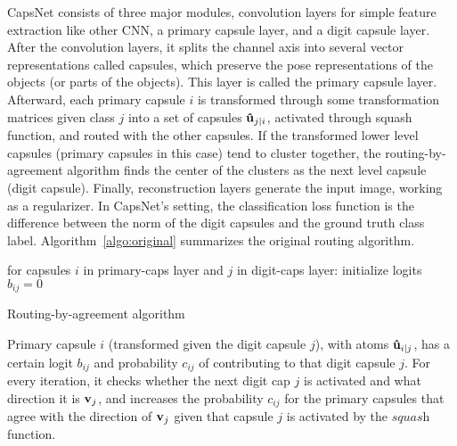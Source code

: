 \documentclass{article}
\begin{document}
CapsNet consists of three major modules, convolution layers for simple feature extraction like other CNN, a primary capsule layer, and a digit capsule layer. After the convolution layers, it splits the channel axis into several vector representations called capsules, which preserve the pose representations of the objects (or parts of the objects). This layer is called the primary capsule layer.  Afterward, each primary capsule $i$ is transformed through some transformation matrices given class $j$ into a set of capsules $\bold{\hat{u}}_{j|i}$, activated through squash function, and routed with the other capsules. If the transformed lower level capsules (primary capsules in this case) tend to cluster together, the routing-by-agreement algorithm finds the center of the clusters as the next level capsule (digit capsule). Finally, reconstruction layers generate the input image, working as a regularizer. In CapsNet's setting, the classification loss function is the difference between the norm of the digit capsules and the ground truth class label. Algorithm~\ref{algo:original} summarizes the original routing algorithm.

\begin{algorithm}
\SetAlgoLined
{}
 for capsules $i$ in primary-caps layer and $j$ in digit-caps layer: initialize logits $b_{ij}=0$  \;
 \caption{Routing-by-agreement algorithm\label{algo:original}}
\end{algorithm}

Primary capsule $i$ (transformed given the digit capsule $j$), with atoms $\bold{\hat{u}}_{i|j}$, has a certain logit $b_{ij}$ and probability $c_{ij}$ of contributing to that digit capsule $j$. For every iteration, it checks whether the next digit cap $j$ is activated and what direction it is $\bold{v}_j$, and increases the probability $c_{ij}$ for the primary capsules that agree with the direction of $\bold{v}_j$ given that capsule $j$ is activated by the $\textit{squash}$ function.
\end{document}
